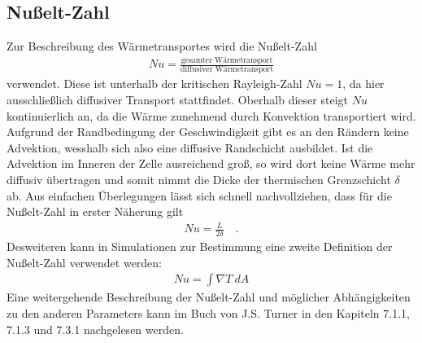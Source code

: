 \documentclass[12pt,a4paper,titlepage,headinclude]{scrartcl}
\numberwithin{equation}{subsection}
\begin{document}
\subsection{Nußelt-Zahl}
Zur Beschreibung des Wärmetransportes wird die Nußelt-Zahl
\begin{align*}
	Nu=\frac{\text{gesamter Wärmetransport}}{\text{diffusiver Wärmetransport}}
\end{align*}
verwendet.
Diese ist unterhalb der kritischen Rayleigh-Zahl $Nu=1$, da hier ausschließlich diffusiver Transport stattfindet.
Oberhalb dieser steigt $Nu$ kontinuierlich an, da die Wärme zunehmend durch Konvektion transportiert wird.
Aufgrund der Randbedingung der Geschwindigkeit gibt es an den Rändern keine Advektion, wesshalb sich also eine diffusive Randschicht ausbildet.
Ist die Advektion im Inneren der Zelle ausreichend groß, so wird dort keine Wärme mehr diffusiv übertragen und somit nimmt die Dicke der thermischen Grenzschicht $\delta$ ab.
Aus einfachen Überlegungen lässt sich schnell nachvollziehen, dass für die Nußelt-Zahl in erster Näherung gilt
\begin{align}
	Nu=\frac{L}{2\delta}\quad.
	\label{eq:nu_grenz}
\end{align}
Desweiteren kann in Simulationen zur Bestimmung eine zweite Definition der Nußelt-Zahl verwendet werden:
\begin{align}
	Nu=\int\nabla T~dA
	\label{eq:nu_grad}
\end{align}
Eine weitergehende Beschreibung der Nußelt-Zahl und möglicher Abhängigkeiten zu den anderen Parameters kann im Buch von J.S. Turner \cite{Bef} in den Kapiteln 7.1.1, 7.1.3 und 7.3.1 nachgelesen werden.
\end{document}
